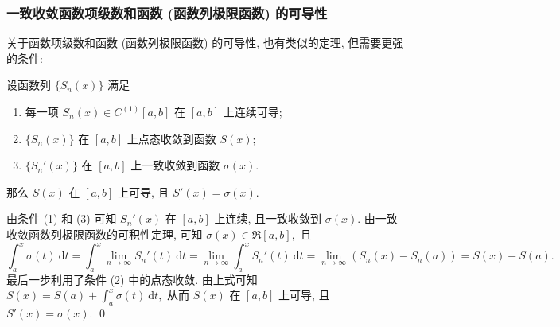 
\begin{frame}
\frametitle{一致收敛函数项级数和函数 (函数列极限函数) 的可导性}

关于函数项级数和函数 (函数列极限函数) 的可导性, 也有类似的定理, 但需要更强的条件:

\begin{thm}[一致收敛函数列极限函数的可导性定理]
设函数列 $\{S_n(x)\}$ 满足
\begin{enumerate}
\item 每一项 $S_n(x) \in C^{(1)}[a, b]$ 在 $[a, b]$ 上连续可导;
\item $\{S_n(x)\}$ 在 $[a, b]$ 上点态收敛到函数 $S(x);$
\item $\{S_n'(x)\}$ 在 $[a, b]$ 上一致收敛到函数 $\sigma(x).$
\end{enumerate}
那么 $S(x)$ 在 $[a, b]$ 上可导, 且 $S'(x) = \sigma(x).$
\end{thm}

\pause
\vspace{0.5em}

\startproof[bg=yellow, fg=red]
由条件 (1) 和 (3) 可知 $S_n'(x)$ 在 $[a, b]$ 上连续, 且一致收敛到 $\sigma(x).$ 由一致收敛函数列极限函数的可积性定理, 可知 $\sigma(x) \in \mathfrak{R}[a, b],$ 且
\[
\int_a^x \sigma(t) ~ \mathrm{d}t = \int_a^x \lim_{n\to\infty} S_n'(t) ~ \mathrm{d}t = \lim_{n\to\infty} \int_a^x S_n'(t) ~ \mathrm{d}t = \lim_{n\to\infty} (S_n(x) - S_n(a)) = S(x) - S(a).
\]
最后一步利用了条件 (2) 中的点态收敛. 由上式可知 $S(x) = S(a) + \int_a^x \sigma(t) ~ \mathrm{d}t,$ 从而 $S(x)$ 在 $[a, b]$ 上可导, 且 $S'(x) = \sigma(x).$
\qed

\end{frame}


